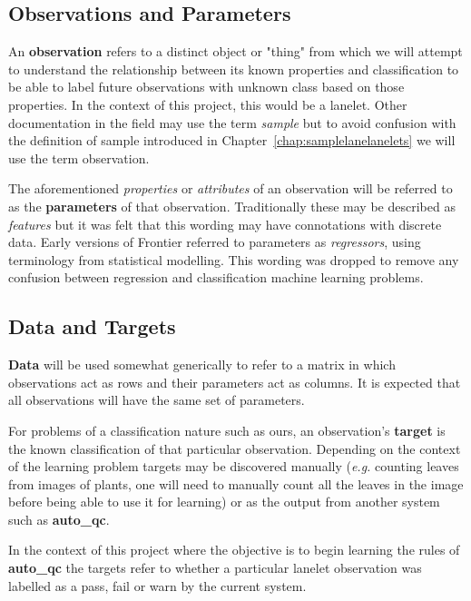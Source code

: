 \subsection{Observations and Parameters}

An \textbf{observation} refers to a distinct object or "thing" from which we
will attempt to understand the relationship between its known properties and
classification to be able to label future observations with unknown class based
on those properties. In the context of this project, this would be a lanelet.
Other documentation in the field may use the term \textit{sample} but to avoid
confusion with the definition of sample introduced in
Chapter~\ref{chap:samplelanelanelets} we will use the term observation.

The aforementioned \textit{properties} or \textit{attributes} of an observation
will be referred to as the \textbf{parameters} of that observation.
Traditionally these may be described as \textit{features} but it was felt that
this wording may have connotations with discrete data. Early versions of
Frontier referred to parameters as \textit{regressors}, using terminology from
statistical modelling. This wording was dropped to remove any confusion between
regression and classification machine learning problems.


\subsection{Data and Targets}

\textbf{Data} will be used somewhat generically to refer to a matrix in which
observations act as rows and their parameters act as columns. It is expected
that all observations will have the same set of parameters.

For problems of a classification nature such as ours, an observation's
\textbf{target} is the known classification of that particular observation.
Depending on the context of the learning problem targets may be discovered
manually (\textit{e.g.} counting leaves from images of plants, one will need to
manually count all the leaves in the image before being able to use it for
learning) or as the output from another system such as \textbf{auto\_qc}.

In the context of this project where the objective is to begin learning the
rules of \textbf{auto\_qc} the targets refer to whether a particular lanelet
observation was labelled as a pass, fail or warn by the current system.


